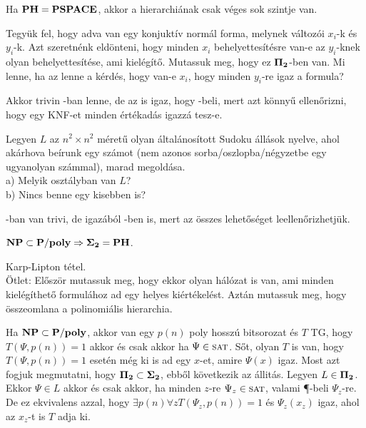 \begin{Exercise}[counter={sorszam}, difficulty=0]
	Ha $\mbox{\ensuremath{\mathbf{PH}}}=\mbox{\ensuremath{\mathbf{PSPACE}}}$, akkor a hierarchiának csak véges sok szintje van.
\end{Exercise}


\begin{Exercise}[counter={sorszam}, difficulty=0]
	Tegy\"uk fel, hogy adva van egy konjukt\'iv norm\'al forma, melynek v\'altoz\'oi $x_i$-k \'es $y_i$-k. Azt szeretn\'enk eld\"onteni, hogy minden $x_i$ behelyettes\'it\'esre van-e az $y_i$-knek olyan behelyettes\'it\'ese, ami kiel\'eg\'it\H o. Mutassuk meg, hogy ez $\mbox{\ensuremath{\mathbf{\Pi_2}}}$-ben van. Mi lenne, ha az lenne a k\'erd\'es, hogy van-e $x_i$, hogy minden $y_i$-re igaz a formula?
\end{Exercise}	 
\begin{Answer}
	Akkor trivin \Sigmatwo-ban lenne, de az is igaz, hogy \NP-beli, mert azt k\"onny\H u ellen\H orizni, hogy egy KNF-et minden \'ert\'ekad\'as igazz\'a tesz-e.
\end{Answer}

\begin{Exercise}[counter={sorszam}, difficulty=0]
	Legyen $L$ az $n^2\times n^2$ m\'eret\H u olyan \'altal\'anos\'itott Sudoku \'all\'asok nyelve, ahol ak\'arhova be\'irunk egy sz\'amot (nem azonos sorba/oszlopba/n\'egyzetbe egy ugyanolyan sz\'ammal), marad megold\'asa.\\
	a) Melyik oszt\'alyban van $L$?\\
	b) Nincs benne egy kisebben is?
\end{Exercise}	
\begin{Answer}
	\Pitwo-ban van trivi, de igaz\'ab\'ol \Sigmaone-ben is, mert az \"osszes lehet\H os\'eget leellen\H orizhetj\"uk.
\end{Answer}

\begin{Exercise}[counter={sorszam}, difficulty=1]
	$\mbox{\ensuremath{\mathbf{NP}}} \subset \mbox{\ensuremath{\mathbf{P/poly}}} \Rightarrow \mbox{\ensuremath{\mathbf{\Sigma_2}}}=\mbox{\ensuremath{\mathbf{PH}}}$.
\end{Exercise}	
\begin{Answer}
	Karp-Lipton t\'etel.\\
	\"Otlet: El\H oször mutassuk meg, hogy ekkor olyan hálózat is van, ami minden kielégíthet\H o \SAT formulához ad egy helyes kiértékelést. Aztán mutassuk meg, hogy \"osszeomlana a polinomi\'alis hierarchia.
	
	Ha $\mbox{\ensuremath{\mathbf{NP}}} \subset \mbox{\ensuremath{\mathbf{P/poly}}}$, akkor van egy $p(n)$ poly hossz\'u bitsorozat \'es $T$ TG, hogy $T(\Psi,p(n))=1$ akkor \'es csak akkor ha $\Psi\in\SAT$. S\H ot, olyan $T$ is van, hogy $T(\Psi,p(n))=1$ eset\'en m\'eg ki is ad egy $x$-et, amire $\Psi(x)$ igaz. Most azt fogjuk megmutatni, hogy $\mbox{\ensuremath{\mathbf{\Pi_2}}}\subset\mbox{\ensuremath{\mathbf{\Sigma_2}}}$, ebb\H ol k\"ovetkezik az \'allit\'as. Legyen $L\in \mbox{\ensuremath{\mathbf{\Pi_2}}}$. Ekkor $\Psi\in L$ akkor \'es csak akkor, ha minden $z$-re $\Psi_z\in \SAT$, valami \P-beli $\Psi_z$-re. De ez ekvivalens azzal, hogy $\exists p(n) \forall z T(\Psi_z,p(n))=1$ \'es $\Psi_z(x_z)$ igaz, ahol az $x_z$-t is $T$ adja ki.
\end{Answer}

